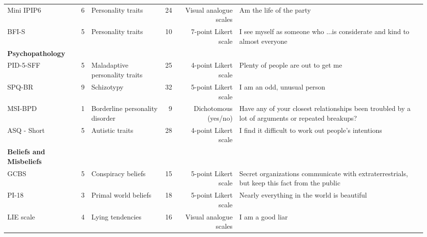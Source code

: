 \begin{table}[t]
\begin{tabular*}{\linewidth}{@{\extracolsep{\fill}}lrlrrl}
Mini IPIP6 & 6 & Personality traits & 24 & Visual analogue scales & Am the life of the party \\ 
BFI-S & 5 & Personality traits & 10 & 7-point Likert scale & I see myself as someone who ...is considerate and kind to almost everyone \\ 
{\bfseries Psychopathology} &  &  &  &  &  \\ 
PID-5-SFF & 5 & Maladaptive personality traits & 25 & 4-point Likert scale & Plenty of people are out to get me \\ 
SPQ-BR & 9 & Schizotypy & 32 & 5-point Likert scale & I am an odd, unusual person \\ 
MSI-BPD & 1 & Borderline personality disorder & 9 & Dichotomous (yes/no) & Have any of your closest relationships been troubled by a lot of arguments or repeated breakups? \\ 
ASQ - Short & 5 & Autistic traits & 28 & 4-point Likert scale & I find it difficult to work out people’s intentions \\ 
{\bfseries Beliefs and Misbeliefs} &  &  &  &  &  \\ 
GCBS & 5 & Conspiracy beliefs & 15 & 5-point Likert scale & Secret organizations communicate with extraterrestrials, but keep this fact from the public \\ 
PI-18 & 3 & Primal world beliefs & 18 & 5-point Likert scale & Nearly everything in the world is beautiful \\ 
LIE scale & 4 & Lying tendencies & 16 & Visual analogue scales & I am a good liar \\ 
\bottomrule
\end{tabular*}
\end{table}

